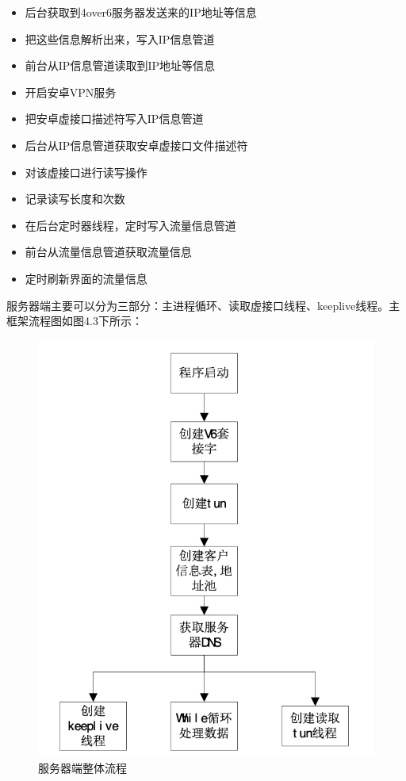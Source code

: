 \begin{itemize}
  \item 后台获取到4over6服务器发送来的IP地址等信息
  \item 把这些信息解析出来，写入IP信息管道
  \item 前台从IP信息管道读取到IP地址等信息
  \item 开启安卓VPN服务
  \item 把安卓虚接口描述符写入IP信息管道
  \item 后台从IP信息管道获取安卓虚接口文件描述符
  \item 对该虚接口进行读写操作
  \item 记录读写长度和次数
  \item 在后台定时器线程，定时写入流量信息管道
  \item 前台从流量信息管道获取流量信息
  \item 定时刷新界面的流量信息
\end{itemize}

服务器端主要可以分为三部分：主进程循环、读取虚接口线程、keeplive线程。主框架流程图如图4.3下所示：
\begin{figure}[!ht]
	\begin{center}
	\includegraphics[scale=.58]{server_all.png}
	\end{center}
	\caption{服务器端整体流程}
	\label{figure:服务器端整体流程图}
\end{figure}

